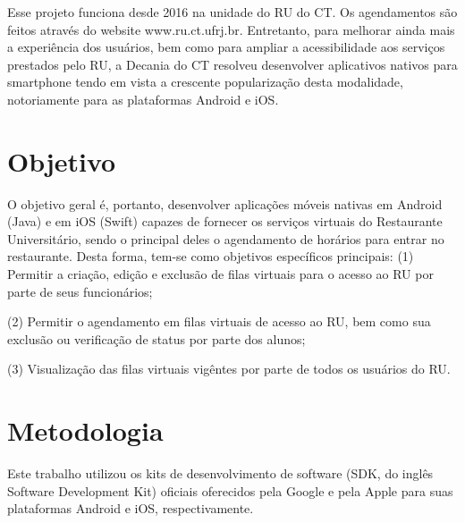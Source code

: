 Esse projeto funciona desde 2016 na unidade do RU do CT. Os agendamentos são feitos através do website
www.ru.ct.ufrj.br. Entretanto, para melhorar ainda mais a experiência dos usuários, bem 
como para ampliar a acessibilidade aos serviços prestados pelo RU, a Decania do CT 
resolveu desenvolver aplicativos nativos para smartphone tendo em vista a crescente popularização desta 
modalidade, notoriamente para as plataformas Android e iOS.

\vspace{0.4cm}
\section{Objetivo}

O objetivo geral é, portanto, desenvolver aplicações móveis nativas em Android (Java) e em iOS (Swift) 
capazes de fornecer os serviços virtuais do Restaurante Universitário, sendo o principal deles
o agendamento de horários para entrar no restaurante. Desta forma, tem-se como objetivos específicos 
principais: 
\bigbreak
(1) Permitir a criação, edição e exclusão de filas virtuais para o acesso ao RU por parte de seus funcionários; 
\par(2) Permitir o agendamento em filas virtuais de acesso ao RU, bem como sua exclusão ou verificação de 
status por parte dos alunos;
\par(3) Visualização das filas virtuais vigêntes por parte de todos os usuários do RU.

\vspace{0.4cm}
\section{Metodologia}

Este trabalho utilizou os kits de desenvolvimento de software (SDK, do inglês Software Development 
Kit) oficiais oferecidos pela Google e pela Apple para suas plataformas Android e iOS, respectivamente.

